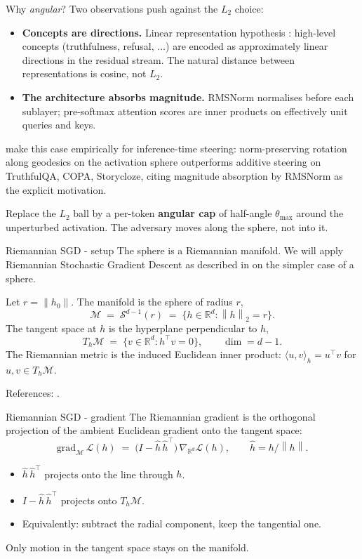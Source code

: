 \documentclass[10pt,aspectratio=169]{beamer}
\newcommand{\R}{\mathbb{R}}
\newcommand{\hh}{\hat h}
\newcommand{\thmax}{\theta_{\max}}
\newcommand{\norm}[1]{\left\lVert#1\right\rVert}
\newcommand{\inner}[2]{\langle #1, #2 \rangle}
\begin{document}
\begin{frame}{Why \emph{angular}?}
Two observations push against the $L_2$ choice:
\begin{itemize}
\item \textbf{Concepts are directions.} Linear representation hypothesis \citep{mikolov2013distributed, park2023linear, jiang2024origins}: high-level concepts (truthfulness, refusal, $\ldots$) are encoded as approximately linear directions in the residual stream. The natural distance between representations is cosine, not $L_2$.
\item \textbf{The architecture absorbs magnitude.} RMSNorm normalises before each sublayer; pre-softmax attention scores are inner products on effectively unit queries and keys.
\end{itemize}

\medskip
\citet{you2026spherical} make this case empirically for inference-time steering: norm-preserving rotation along geodesics on the activation sphere outperforms additive steering on TruthfulQA, COPA, Storycloze, citing magnitude absorption by RMSNorm as the explicit motivation.

\medskip
Replace the $L_2$ ball by a per-token \textbf{angular cap} of half-angle $\thmax$ around the unperturbed activation. The adversary moves along the sphere, not into it.
\end{frame}
\begin{frame}{Riemannian SGD - setup}
The sphere is a Riemannian manifold. We will apply Riemannian Stochastic Gradient Descent as described in \cite{bonnabel2013stochastic} on the simpler case of a sphere.

\smallskip
Let $r = \norm{h_0}$. The manifold is the sphere of radius $r$,
\[
\mathcal{M} \;=\; \mathcal{S}^{d-1}(r) \;=\; \{ h \in \R^d : \norm{h}_2 = r \}.
\]
The tangent space at $h$ is the hyperplane perpendicular to $h$,
\[
T_h \mathcal{M} \;=\; \{ v \in \R^d : h^\top v = 0 \},\qquad \dim = d-1.
\]
The Riemannian metric is the induced Euclidean inner product: $\inner{u}{v}_h = u^\top v$ for $u,v \in T_h\mathcal{M}$.

\smallskip
\footnotesize
References: \citet{bonnabel2013stochastic, tripuraneni2018averaging, boumal2023introduction}.
\end{frame}

\begin{frame}{Riemannian SGD - gradient}
The Riemannian gradient is the orthogonal projection of the ambient Euclidean gradient onto the tangent space:
\[
\mathrm{grad}_{\mathcal{M}}\,\mathcal{L}(h) \;=\; \big(I - \hh\,\hh^\top\big)\,\nabla_{\R^d}\mathcal{L}(h), \qquad \hh = h / \norm{h}.
\]
\begin{itemize}
\item $\hh\,\hh^\top$ projects onto the line through $h$.
\item $I - \hh\,\hh^\top$ projects onto $T_h\mathcal{M}$.
\item Equivalently: subtract the radial component, keep the tangential one.
\end{itemize}
Only motion in the tangent space stays on the manifold.
\end{frame}
\end{document}
